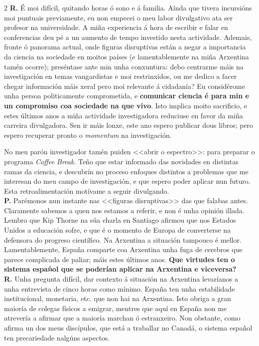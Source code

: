 \begin{refsection}
\begin{multicols}{2}
\noindent \textbf{R.} \hspace{5px} É moi difícil, quitando horas ó sono e á familia. Aínda que tivera incursións moi puntuais previamente, eu non empecei o meu labor divulgativo ata ser profesor na universidade. A miña experiencia á hora de escribir e falar en conferencias deu pé a un aumento de tempo investido nesta actividade. Ademais, fronte ó panorama actual, onde figuras disruptivas están a negar a importancia da ciencia na sociedade en moitos países (e lamentablemente na miña Arxentina tamén ocorre); preséntase ante min unha conxuntura: debo centrarme máis na investigación en temas vangardistas e moi restrinxidos, ou me dedico a facer chegar información máis xeral pero moi relevante á cidadanía? Eu considérome unha persoa politicamente comprometida, e \textbf{comunicar ciencia é para min e un compromiso coa sociedade na que vivo}. Isto implica moito sacrificio, e estes últimos anos a miña actividade investigadora reduciuse en favor da miña carreira divulgadora. Sen ir máis lonxe, este ano espero publicar dous libros; pero espero recuperar pronto o \emph{momentum} na investigación.

No meu parón investigador tamén puiden <<abrir o espectro>>: para preparar o programa \emph{Coffee Break}. Teño que estar informado das novidades en distintas ramas da ciencia, e descubrín no proceso enfoques distintos a problemas que me interesan do meu campo de investigación, e que espero poder aplicar nun futuro. Esta retroalimentación motívame a seguir divulgando.\\

\noindent \textbf{P.} \hspace{5px} Parémonos nun instante nas <<figuras disruptivas>> das que falabas antes. Claramente sabemos a quen nos estamos a referir, e non é unha opinión illada. Lembro que Kip Thorne na súa charla en Santiago afirmou que nos Estados Unidos a educación sofre, e que é o momento de Europa de converterse na defensora do progreso científico. Na Arxentina a situación tampouco é mellor. Lamentablemente, España comparte coa Arxentina unha fuga de cerebros que parece complicada de paliar; máis estes últimos anos. \textbf{Que virtudes ten o sistema español que se poderían aplicar na Arxentina e viceversa?} \\

\noindent \textbf{R.} \hspace{5px} Unha pregunta difícil, dar contexto á situación na Arxentina levaríanos a unha entrevista de cinco horas como mínimo. España ten unha estabilidade institucional, monetaria, etc. que non hai na Arxentina. Isto obriga a gran maioría de colegas físicos a emigrar, mentres que aquí en España non me atrevería a afirmar que a maioría marchan ó estranxeiro. Non obstante, como afirma un dos meus discípulos, que está a traballar no Canadá, o sistema español ten precariedade nalgúns aspectos.


\end{multicols}
\end{refsection}
